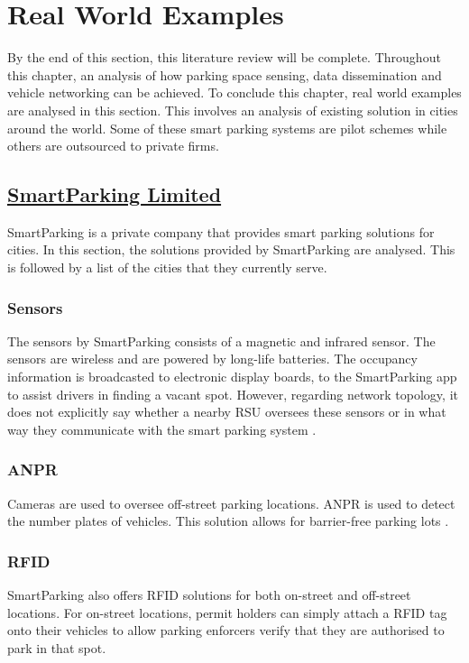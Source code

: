 \section{Real World Examples}
By the end of this section, this literature review will be complete. Throughout this chapter, an analysis of how parking space sensing, data dissemination and vehicle networking can be achieved. To conclude this chapter, real world examples are analysed in this section. This involves an analysis of existing solution in cities around the world. Some of these smart parking systems are pilot schemes while others are outsourced to private firms.

\subsection*{\underline{SmartParking Limited}}
SmartParking \citep{18} is a private company that provides smart parking solutions for cities. In this section, the solutions provided by SmartParking are analysed. This is followed by a list of the cities that they currently serve.

\subsubsection{Sensors}
The sensors by SmartParking consists of a magnetic and infrared sensor. The sensors are wireless and are powered by long-life batteries. The occupancy information is broadcasted to electronic display boards, to the SmartParking app to assist drivers in finding a vacant spot. However, regarding network topology, it does not explicitly say whether a nearby \ac{RSU} oversees these sensors or in what way they communicate with the smart parking system \citep{2017SensorsSmartParking}.

\subsubsection{ANPR}
Cameras are used to oversee off-street parking locations. \ac{ANPR} is used to detect the number plates of vehicles. This solution allows for barrier-free parking lots \citep{2017ANPRSmartParking}.

\subsubsection{RFID}
SmartParking also offers \ac{RFID} solutions for both on-street and off-street locations. For on-street locations, permit holders can simply attach a \ac{RFID} tag onto their vehicles to allow parking enforcers verify that they are authorised to park in that spot.

